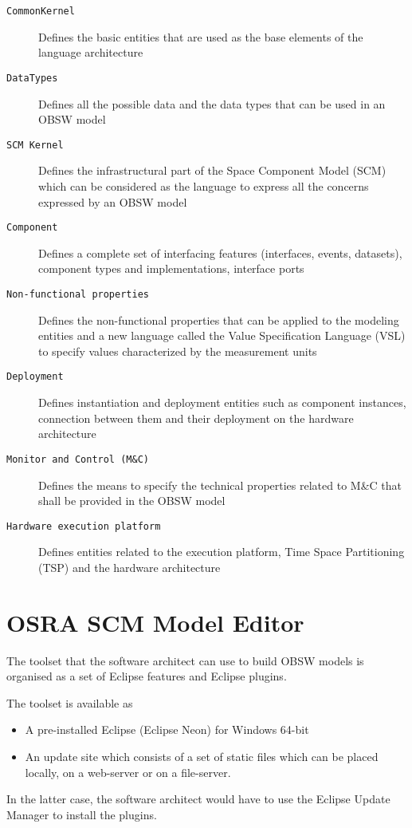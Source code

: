 \begin{description}
\item [\texttt{CommonKernel}] Defines the basic entities that are used as the base elements of the language architecture
\item [\texttt{DataTypes}] Defines all the possible data and the data types that can be used in an OBSW model
\item [\texttt{SCM Kernel}] Defines the infrastructural part of the Space Component Model (SCM) which can be considered as the language to express all the concerns expressed by an OBSW model
\item [\texttt{Component}] Defines a complete set of interfacing features (interfaces, events, datasets), component types and implementations, interface ports
\item [\texttt{Non-functional properties}] Defines the non-functional properties that can be applied to the modeling entities and a new language called the Value Specification Language (VSL) to specify values characterized by the measurement units
\item [\texttt{Deployment}] Defines instantiation and deployment entities such as component instances, connection between them and their deployment on the hardware architecture
\item [\texttt{Monitor and Control (M\&C)}] Defines the means to specify the technical properties related to M\&C that shall be provided in the OBSW model
\item [\texttt{Hardware execution platform}] Defines entities related to the execution platform, Time Space Partitioning (TSP) and the hardware architecture   
\end{description}

\section{OSRA SCM Model Editor}
\label{OSRA editor} 
The toolset that the software architect can use to build OBSW models is organised as a set of Eclipse features and Eclipse plugins. 

The toolset is available as
\begin{itemize}
\item A pre-installed Eclipse (Eclipse Neon) for Windows 64-bit  
\item An update site which consists of a set of static files which can be placed locally, on a web-server or on a file-server. 
\end{itemize}
In the latter case, the software architect would have to use the Eclipse Update Manager to install the plugins. 

